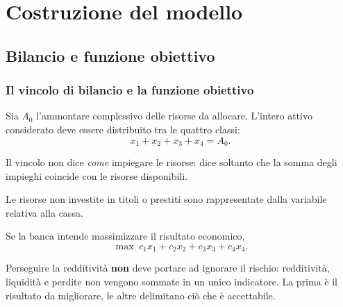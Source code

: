 

\section{Costruzione del modello}



\subsection{Bilancio e funzione obiettivo}%

\begin{frame}%
%

\frametitle{Il vincolo di bilancio e la funzione obiettivo}%
%

%


Sia $A_{0}$ l'ammontare complessivo delle risorse da allocare. L'intero attivo
considerato deve essere distribuito tra le quattro classi:
\[
x_{1}+x_{2}+x_{3}+x_{4}=A_{0}.
\]


\begin{stepitemize}
\item Il vincolo non dice \emph{come} impiegare le risorse: dice soltanto che
la somma degli impieghi coincide con le risorse disponibili.

\item Le risorse non investite in titoli o prestiti sono rappresentate dalla
variabile relativa alla cassa.
\end{stepitemize}

\medskip

Se la banca intende massimizzare il risultato economico,
\[
\max\; c_{1}x_{1}+c_{2}x_{2}+c_{3}x_{3}+c_{4}x_{4}.
\]


\medskip

\begin{center}
{\small Perseguire la redditivit\`{a} \textbf{non} deve portare ad ignorare il
rischio: redditivit\`{a}, liquidit\`{a} e perdite non vengono sommate in un
unico indicatore. La prima \`{e} il risultato da migliorare, le altre
delimitano ci\`{o} che \`{e} accettabile.}
\end{center}

%

\transboxout
\end{frame}%


